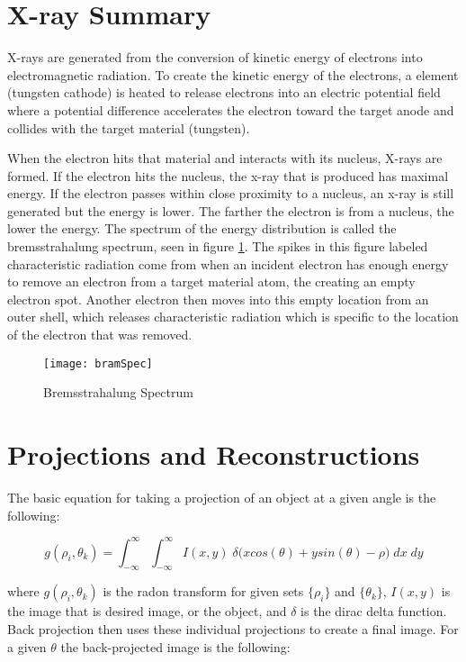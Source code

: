 \section{X-ray Summary}

X-rays are generated from the conversion of kinetic energy of electrons into electromagnetic radiation. To create the kinetic energy of the electrons, a element (tungsten cathode) is heated to release electrons into an electric potential field where a potential difference accelerates the electron toward the target anode and collides with the target material (tungsten).

When the electron hits that material and interacts with its nucleus, X-rays are formed. If the electron hits the nucleus, the x-ray that is produced has maximal energy. If the electron passes within close proximity to a nucleus, an x-ray is still generated but the energy is lower.  The farther the electron is from a nucleus, the lower the energy.  The spectrum of the energy distribution is called the bremsstrahalung spectrum, seen in figure \ref{fig:brem}.  The spikes in this figure labeled characteristic radiation come from when an incident electron has enough energy to remove an electron from a target material atom, the creating an empty electron spot.  Another electron then moves into this empty location from an outer shell, which releases characteristic radiation which is specific to the location of the electron that was removed. 

\begin{figure}[h]
	\centering
	\texttt{[image: bramSpec]}
	\caption{Bremsstrahalung Spectrum}
	\label{fig:brem}
\end{figure}

\section{Projections and Reconstructions}

The basic equation for taking a projection of an object at a given angle is the following:

\begin{equation}
g(\rho_i,\theta_k) = \int_{-\infty}^{\infty} \int_{-\infty}^{\infty} I(x,y) \; \delta \big(xcos(\theta) + ysin(\theta) - \rho \big) \; dx \; dy
\label{eq:Radon}
\end{equation}

\noindent
where $g(\rho_i,\theta_k)$ is the radon transform for given sets $\{\rho_i\}$ and $\{\theta_k\}$, $I(x,y)$ is the image that is desired image, or the object, and $\delta$ is the dirac delta function. Back projection then uses these individual projections to create a final image.  For a given $\theta$ the back-projected image is the following:

